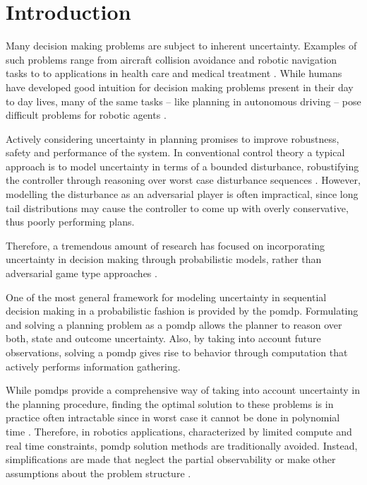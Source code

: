 \chapter{Introduction}\label{chap:introduction}

Many decision making problems are subject to inherent uncertainty. Examples of
such problems range from aircraft collision avoidance and robotic navigation
tasks to to applications in health care and medical treatment
\cite{kochenderfer2012next, bandyopadhyay2013intention, pineau2003towards,
schaefer2005modeling}. While humans have developed good intuition for decision
making problems present in their day to day lives, many of the same tasks --
like planning in autonomous driving -- pose difficult problems for robotic
agents \cite{levinson2011towards}.

Actively considering uncertainty in planning promises to improve robustness,
safety and performance of the system. In conventional control theory a typical
approach is to model uncertainty in terms of a bounded disturbance,
robustifying the controller through reasoning over worst case disturbance
sequences \cite{petersen2012robust}. However, modelling the disturbance as an
adversarial player is often impractical, since long tail distributions may
cause the controller to come up with overly conservative, thus poorly
performing plans.

Therefore, a tremendous amount of research has focused on incorporating
uncertainty in decision making through probabilistic models, rather than
adversarial game type approaches \cite{roy1999coastal, amato2015planning,
fisac2018probabilistically, choudhury2019dynamic}.

One of the most general framework for modeling uncertainty in sequential
decision making in a probabilistic fashion is provided by the \ac{pomdp}.
Formulating and solving a planning problem as a \ac{pomdp} allows the planner
to reason over both, state and outcome uncertainty. Also, by taking into
account future observations, solving a \ac{pomdp} gives rise to behavior
through computation that actively performs information gathering.

While \acp{pomdp} provide a comprehensive way of taking into account
uncertainty in the planning procedure, finding the optimal solution to these
problems is in practice often intractable since in worst case it cannot be
done in polynomial time \cite{papadimitriou1987complexity}. Therefore, in
robotics applications, characterized by limited compute and real time
constraints, \ac{pomdp} solution methods are traditionally avoided. Instead,
simplifications are made that neglect the partial observability or make other
assumptions about the problem structure \cite{sadigh2016information,
fisac2018probabilistically}.

